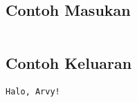 \documentclass{article}
\begin{document}
\begin{multicols}{2}
\subsection*{Contoh Masukan}
\begin{lstlisting}

\end{lstlisting}
\columnbreak
\subsection*{Contoh Keluaran}
\begin{lstlisting}
Halo, Arvy!
\end{lstlisting}
\vfill
\null
\end{multicols}


\pagebreak
\end{document}
